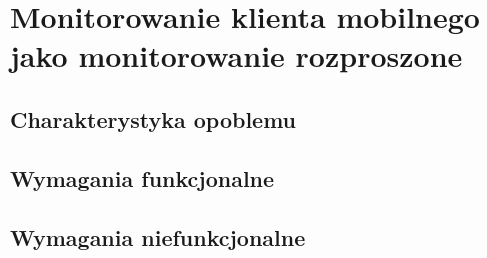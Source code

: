 \chapter{Monitorowanie klienta mobilnego jako monitorowanie rozproszone}

\section[Charakterystyka problemu][Charakterystyka problemu]{Charakterystyka opoblemu}

\section[Wymagania funkcjonalne][Wymagania funkcjonalne]{Wymagania funkcjonalne}

\section[Wymagania niefunkcjonalne][Wymagania niefunkcjonalne]{Wymagania niefunkcjonalne}
